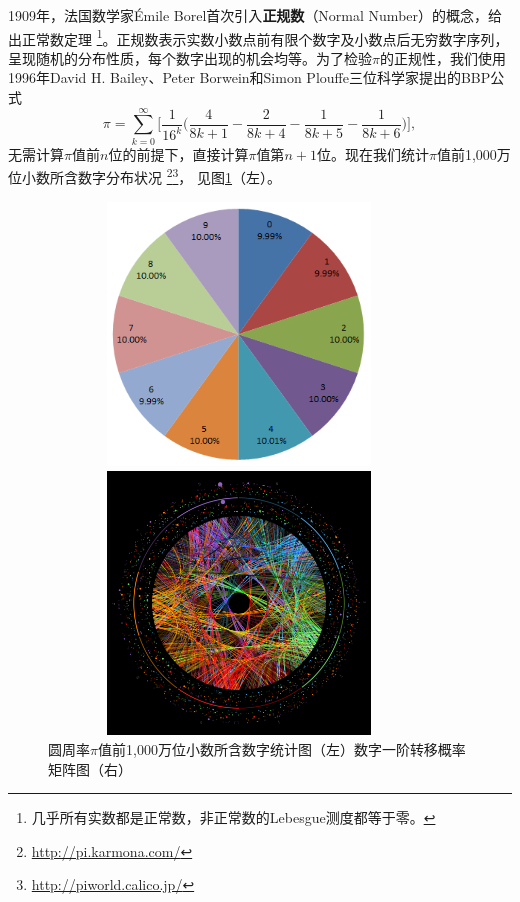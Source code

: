 \begin{example}[圆周率与统计]
1909年，法国数学家\'{E}mile Borel首次引入\textbf{正规数}（Normal Number）的概念，给出正常数定理
\footnote{几乎所有实数都是正常数，非正常数的Lebesgue测度都等于零。}。正规数表示实数小数点前有限个数字及小数点后无穷数字序列，呈现随机的分布性质，每个数字出现的机会均等。为了检验$\pi$的正规性，我们使用1996年David H. Bailey、Peter Borwein和Simon Plouffe三位科学家提出的BBP公式
\[
    \pi = \sum\limits_{k=0}^\infty \Bigg[\frac{1}{16^k}\bigg(\frac{4}{8k+1} - \frac{2}{8k+4} - \frac{1}{8k+5} - \frac{1}{8k+6}\bigg)\Bigg],
\]
无需计算$\pi$值前$n$位的前提下，直接计算$\pi$值第$n+1$位。现在我们统计$\pi$值前1,000万位小数所含数字分布状况
\footnote{\href{http://pi.karmona.com/}{http://pi.karmona.com/}}{}\footnote{\href{http://piworld.calico.jp/estart.html}{http://piworld.calico.jp/}}，
见图\ref{fig:pipie}（左）。
\begin{figure}[ht]
    \begin{minipage}[t]{0.5\linewidth}
        \centering
          \includegraphics[width=0.9\textwidth,height=7cm]{figures/pipie}
    \end{minipage}
    \begin{minipage}[t]{0.5\linewidth}
        \centering
          \includegraphics[width=0.9\textwidth,height=7cm]{figures/imrs-pi}
    \end{minipage}
    \caption{圆周率$\pi$值前1,000万位小数所含数字统计图（左）数字一阶转移概率矩阵图（右）}\label{fig:pipie}
\end{figure}


\end{example}
